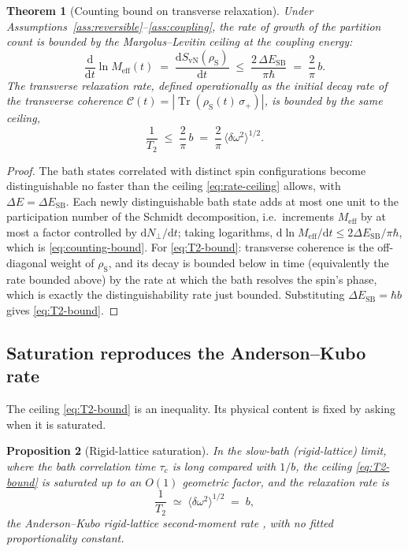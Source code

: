 \documentclass[twocolumn,10pt,a4paper]{article}
\theoremstyle{thmstyle}
\newtheorem{theorem}{Theorem}[section]
\newtheorem{proposition}[theorem]{Proposition}
\theoremstyle{definition}
\theoremstyle{remark}
\newcommand{\Tr}{\operatorname{Tr}}
\newcommand{\sysrho}{\rho_{\mathrm{S}}}
\newcommand{\Svn}{S_{\mathrm{vN}}}
\newcommand{\Meff}{M_{\mathrm{eff}}}
\newcommand{\Ttwo}{T_{2}}
\newcommand{\dd}{\mathrm{d}}
\begin{document}
\begin{theorem}[Counting bound on transverse relaxation]
\label{thm:counting-bound}
Under Assumptions~\ref{ass:reversible}--\ref{ass:coupling}, the rate of
growth of the partition count is bounded by the Margolus--Levitin ceiling
at the coupling energy:
\begin{equation}
\frac{\dd}{\dd t}\ln\Meff(t)
\;=\;\frac{\dd \Svn(\sysrho)}{\dd t}
\;\leq\;\frac{2\,\Delta E_{\mathrm{SB}}}{\pi\hbar}
\;=\;\frac{2}{\pi}\,b .
\label{eq:counting-bound}
\end{equation}
The transverse relaxation rate, defined operationally as the initial
decay rate of the transverse coherence
$\mathcal{C}(t)=|\Tr(\sysrho(t)\,\sigma_{+})|$, is bounded by the same
ceiling,
\begin{equation}
\frac{1}{\Ttwo}\;\leq\;\frac{2}{\pi}\,b
\;=\;\frac{2}{\pi}\,\langle\delta\omega^{2}\rangle^{1/2}.
\label{eq:T2-bound}
\end{equation}
\end{theorem}

\begin{proof}
The bath states correlated with distinct spin configurations become
distinguishable no faster than the ceiling \eqref{eq:rate-ceiling} allows,
with $\Delta E=\Delta E_{\mathrm{SB}}$. Each newly distinguishable bath
state adds at most one unit to the participation number of the Schmidt
decomposition, i.e.\ increments $\Meff$ by at most a factor controlled by
$\dd N_{\perp}/\dd t$; taking logarithms, $\dd\ln\Meff/\dd t\leq
2\Delta E_{\mathrm{SB}}/\pi\hbar$, which is \eqref{eq:counting-bound}. For
\eqref{eq:T2-bound}: transverse coherence is the off-diagonal weight of
$\sysrho$, and its decay is bounded below in time (equivalently the rate
bounded above) by the rate at which the bath resolves the spin's phase,
which is exactly the distinguishability rate just bounded. Substituting
$\Delta E_{\mathrm{SB}}=\hbar b$ gives \eqref{eq:T2-bound}.
\end{proof}

\subsection{Saturation reproduces the Anderson--Kubo rate}

The ceiling \eqref{eq:T2-bound} is an inequality. Its physical content is
fixed by asking when it is saturated.

\begin{proposition}[Rigid-lattice saturation]
\label{prop:saturation}
In the slow-bath (rigid-lattice) limit, where the bath correlation time
$\tau_{c}$ is long compared with $1/b$, the ceiling
\eqref{eq:T2-bound} is saturated up to an $O(1)$ geometric factor, and the
relaxation rate is
\begin{equation}
\frac{1}{\Ttwo}\;\simeq\;\langle\delta\omega^{2}\rangle^{1/2}
\;=\;b,
\label{eq:AK}
\end{equation}
the Anderson--Kubo rigid-lattice second-moment rate
\citep{anderson1953,kubo1962}, with no fitted proportionality constant.
\end{proposition}
\end{document}
